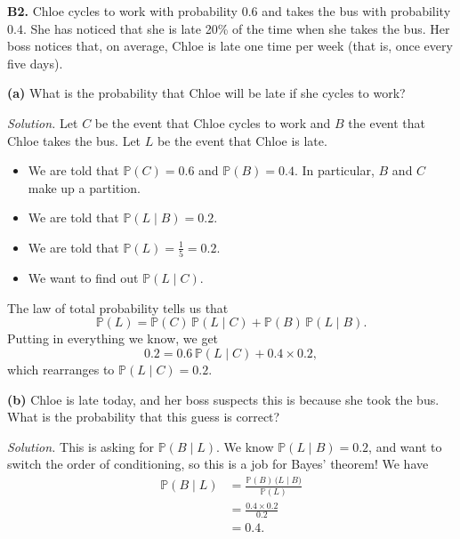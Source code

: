 \documentclass[
  a4paper,
]{book}
\providecommand{\tightlist}{%
  \setlength{\itemsep}{0pt}\setlength{\parskip}{0pt}}
\theoremstyle{definition}
\theoremstyle{definition}
\theoremstyle{definition}
\theoremstyle{definition}
\theoremstyle{remark}
\begin{document}
\textbf{B2.} Chloe cycles to work with probability \(0.6\) and takes the bus with probability \(0.4\). She has noticed that she is late 20\% of the time when she takes the bus. Her boss notices that, on average, Chloe is late one time per week (that is, once every five days).

\textbf{(a)} What is the probability that Chloe will be late if she cycles to work?

\begin{myanswers}
\emph{Solution.}
Let \(C\) be the event that Chloe cycles to work and \(B\) the event that Chloe takes the bus. Let \(L\) be the event that Chloe is late.

\begin{itemize}
\tightlist
\item
  We are told that \(\mathbb P(C) = 0.6\) and \(\mathbb P(B) = 0.4\). In particular, \(B\) and \(C\) make up a partition.
\item
  We are told that \(\mathbb P(L \mid B) = 0.2\).
\item
  We are told that \(\mathbb P(L) = \frac15 = 0.2\).
\item
  We want to find out \(\mathbb P(L \mid C)\).
\end{itemize}

The law of total probability tells us that
\[  \mathbb P(L) = \mathbb P(C)\,\mathbb P(L \mid C) + \mathbb P(B) \, \mathbb P(L \mid B) . \]
Putting in everything we know, we get
\[ 0.2 = 0.6 \,\mathbb P(L \mid C) + 0.4 \times 0.2 , \]
which rearranges to \(\mathbb P(L \mid C) = 0.2\).

\end{myanswers}

\textbf{(b)} Chloe is late today, and her boss suspects this is because she took the bus. What is the probability that this guess is correct?

\begin{myanswers}
\emph{Solution.}
This is asking for \(\mathbb P(B \mid L)\). We know \(\mathbb P(L \mid B) = 0.2\), and want to switch the order of conditioning, so this is a job for Bayes' theorem! We have
\begin{align*}
\mathbb P(B \mid L) &= \frac{\mathbb P(B) \, \mathbb (L \mid B)}{\mathbb P(L)} \\
  &= \frac{0.4 \times 0.2}{0.2} \\
  &= 0.4 .
\end{align*}

\end{myanswers}
\end{document}
